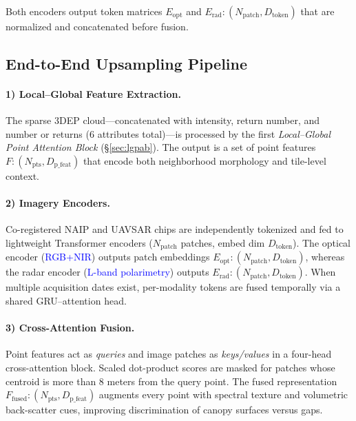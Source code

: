 \documentclass[preprints,article,accept,pdftex,moreauthors]{Definitions/mdpi}
\begin{document}
Both encoders output token matrices $E_{\text{opt}}$ and $E_{\text{rad}}: (N_{\text{patch}}, D_{\text{token}})$ that are normalized and concatenated before fusion.



\clearpage

\subsection{End-to-End Upsampling Pipeline}
\label{sec:pipeline}

\paragraph{1) Local–Global Feature Extraction.}
The sparse 3DEP cloud—concatenated with intensity, return number, and number or returns (6 attributes total)—is processed by the first \emph{Local–Global Point Attention Block} (§\ref{sec:lgpab}). The output is a set of point features $F: (N_{\text{pts}}, D_{\text{p\_feat}})$ that encode both neighborhood morphology and tile-level context.

\paragraph{2) Imagery Encoders.}
Co-registered NAIP and UAVSAR chips are independently tokenized and fed to lightweight Transformer encoders ($N_{\text{patch}}$ patches, embed dim $D_{\text{token}}$).  
The optical encoder (\textcolor{blue}{RGB+NIR}) outputs patch embeddings $E_{\text{opt}}: (N_{\text{patch}}, D_{\text{token}})$, whereas the radar encoder (\textcolor{blue}{L-band polarimetry}) outputs $E_{\text{rad}}: (N_{\text{patch}}, D_{\text{token}})$.  
When multiple acquisition dates exist, per-modality tokens are fused temporally via a shared GRU–attention head.

\paragraph{3) Cross-Attention Fusion.}
Point features act as \emph{queries} and image patches as \emph{keys/values} in a four-head cross-attention block.  
Scaled dot-product scores are masked for patches whose centroid is more than 8 meters from the query point. 
The fused representation $F_{\text{fused}}: (N_{\text{pts}}, D_{\text{p\_feat}})$ augments every point with spectral texture and volumetric back-scatter cues, improving discrimination of canopy surfaces versus gaps.
\end{document}
